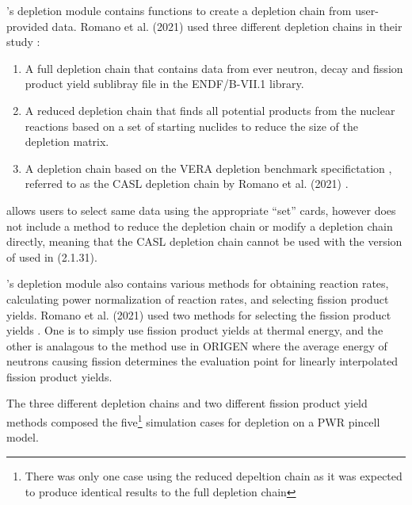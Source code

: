 \OpenMC's depletion module contains functions to create a depletion chain from
user-provided data. Romano et al. (2021) used three different depletion chains
in their study \cite{romano_depletion_2021}:
\begin{enumerate}
    \item A full depletion chain that contains data from ever neutron, decay
        and fission product yield sublibray file in the ENDF/B-VII.1 library.
    \item A reduced depletion chain that finds all potential products from the
        nuclear reactions based on a set of starting nuclides to reduce the
        size of the depletion matrix.
    \item A depletion chain based on the VERA depletion benchmark
        specifictation \cite{kim_specification_2015}, referred to as the CASL
        depletion chain by Romano et al. (2021) \cite{romano_depletion_2021}.
\end{enumerate}
\SerpentTWO allows users to select same data using the appropriate ``set''
cards, however does not include a method to reduce the depletion chain or
modify a depletion chain directly, meaning that the CASL depletion chain cannot
be used with the version of \SerpentTWO used in \cite{romano_depletion_2021}
(2.1.31).

\OpenMC's depletion module also contains various methods for obtaining reaction
rates, calculating power normalization of reaction rates, and selecting fission
product yields. Romano et al. (2021) used two methods  for selecting the fission
product yields \cite{romano_depletion_2021}. One is to simply use fission product
yields at thermal energy, and the other is analagous to the method use in
ORIGEN \cite{gauld_isotopic_2011} where the average energy of neutrons causing
fission determines the evaluation point for linearly interpolated fission
product yields.

The three different depletion chains and two different fission product yield
methods composed the five\footnote{There was only one case using the reduced
depeltion chain as it was expected to produce identical results to the full
depletion chain} simulation cases for depletion on a PWR pincell model.

